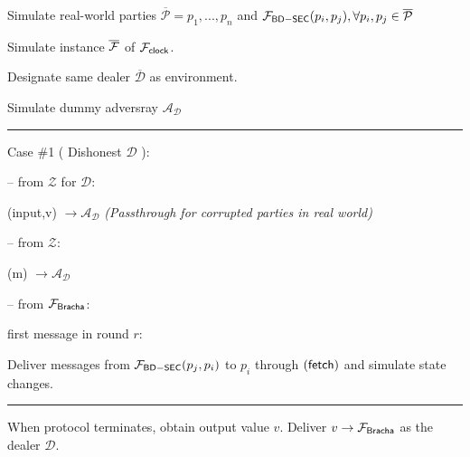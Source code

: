 %
%
%
%
%
%
%
%
%
%
%
%
%
%
%
%
\begin{bbox}[title={Simulator $S_{\msf{Bracha}}$}]

Simulate real-world parties $\overline{\mathcal{P}} = p_1,...,p_n$ and $\mathcal{F}_{{\mathsf {BD-SEC}}}(p_i,p_j), \forall p_i,p_j \in \overline{\mathcal{P}}$

Simulate instance $\overline{\mathcal{F}}$ of $\mathcal{F}_{{\mathsf {clock}}}$.

Designate same dealer $\overline{\mathcal{D}}$ as environment.

Simulate dummy adversray $\mathcal{A}_{\mathcal{D}}$

\vspace{2mm} \hrule \vspace{2mm}

Case \#1 ( Dishonest $\mathcal{D}$ ):

-- \OnInput {} from $\mathcal{Z}$ for $\mathcal{D}$:

	\qquad \Send (input,v) $\rightarrow \mathcal{A}_{\mathcal{D}}$ {\em (Passthrough for corrupted parties in real world)}

-- \OnInput {} from $\mathcal{Z}$:

	\qquad \Send (m) $\rightarrow \mathcal{A}_{\mathcal{D}}$

-- \OnInput {} from $\mathcal{F}_{{\mathsf {Bracha}}}$:

	\qquad \If first message in round $r$:

		\qquad \quad Deliver messages from $\mathcal{F}_{{\mathsf {BD-SEC}}}(p_j,p_i)$ to $p_i$ through $({\mathsf {fetch}})$ and simulate state changes.

\vspace{2mm} \hrule \vspace{2mm}

When protocol terminates, obtain output value $v$. Deliver $v \rightarrow \mathcal{F}_{{\mathsf {Bracha}}}$ as the dealer $\mathcal{D}$.

\end{bbox}
